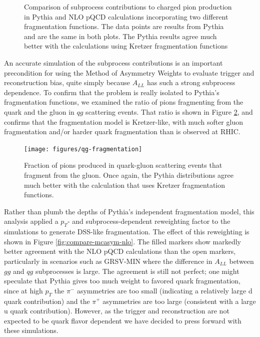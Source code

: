 \begin{figure}
  \caption{Comparison of subprocess contributions to charged pion production
  in Pythia and NLO pQCD calculations incorporating two different
  fragmentation functions.  The data points are results from Pythia and are the same in both plots. The Pythia results agree much better with the
  calculations using Kretzer fragmentation functions}
  \label{fig:subprocess-fractions}
\end{figure}

An accurate simulation of the subprocess contributions is an important
precondition for using the Method of Asymmetry Weights to evaluate trigger and
reconstruction bias, quite simply because $A_{LL}$ has such a strong subprocess
dependence. To confirm that the problem is really isolated to Pythia's
fragmentation functions, we examined the ratio of pions fragmenting from the
quark and the gluon in \(qg\) scattering events. That ratio is shown in Figure
\ref{fig:qg-fragmentation}, and confirms that the fragmentation model is
Kretzer-like, with much softer gluon fragmentation and/or harder quark
fragmentation than is observed at RHIC.

\begin{figure}
  \begin{center}
    \texttt{[image: figures/qg-fragmentation]}
  \end{center}
  \caption{Fraction of pions produced in quark-gluon scattering events that
  fragment from the gluon. Once again, the Pythia distributions agree much
  better with the calculation that uses Kretzer fragmentation functions.}
  \label{fig:qg-fragmentation}
\end{figure}



Rather than plumb the depths of Pythia's independent fragmentation model, this
analysis applied a $p_{T}$- and subprocess-dependent reweighting factor to the
simulations to generate DSS-like fragmentation. The effect of this reweighting
is shown in Figure \ref{fig:compare-mcasym-nlo}. The filled markers show
markedly better agreement with the NLO pQCD calculations than the open markers,
particularly in scenarios such as GRSV-MIN where the difference in $A_{LL}$
between \(gg\) and \(qg\) subprocesses is large. The agreement is still not
perfect; one might speculate that Pythia gives too much weight to favored quark
fragmentation, since at high $p_{T}$ the $\pi^{-}$ asymmetries are too small
(indicating a relatively large d quark contribution) and the $\pi^{+}$
asymmetries are too large (consistent with a large u quark contribution).
However, as the trigger and reconstruction are not expected to be quark flavor
dependent we have decided to press forward with these simulations.

